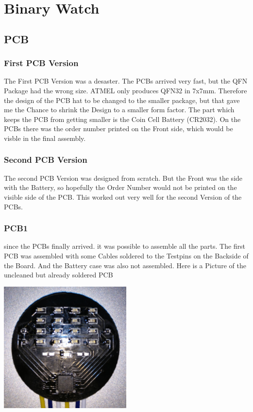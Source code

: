 \newpage
\section{Binary Watch}
\subsection{PCB}
\subsubsection{First PCB Version}
The First PCB Version was a desaster. The PCBs arrived very fast, but the QFN Package had the wrong size.
ATMEL only produces QFN32 in 7x7mm. Therefore the design of the PCB hat to be changed to the smaller package,
but that gave me the Chance to shrink the Design to a smaller form factor.
The part which keeps the PCB from getting smaller is the Coin Cell Battery (CR2032).
On the PCBs there was the order number printed on the Front side, which would be visble in the final assembly.
\subsubsection{Second PCB Version}

The second PCB Version was designed from scratch. But the Front was the side with the Battery, so hopefully the Order Number would not be printed on the visible side of the PCB. This worked out very well for the second Version of the PCBs.
\subsubsection{PCB1}

since the PCBs finally arrived. it was possible to assemble all the parts.
The first PCB was assembled with some Cables soldered to the Testpins on the Backside of the Board.
And the Battery case was also not assembled.
Here is a Picture of the uncleaned but already soldered PCB
\begin{center}
  \includegraphics[width=0.5\textwidth]{../Pictures/PCB1_F1.jpg}
\end{center}

